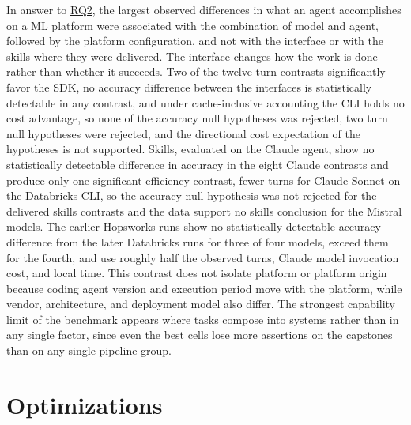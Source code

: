 \documentclass[
english,                 %
bibtex,                  %
]{kththesis}
\numberwithin{listing}{chapter}
\begin{document}
In answer to \hyperref[rq2]{RQ2}, the largest observed differences in what an agent accomplishes on a \gls{ML} platform were associated with the combination of model and agent, followed by the platform configuration, and not with the interface or with the skills where they were delivered. The interface changes how the work is done rather than whether it succeeds. Two of the twelve turn contrasts significantly favor the \gls{SDK}, no accuracy difference between the interfaces is statistically detectable in any contrast, and under cache-inclusive accounting the \gls{CLI} holds no cost advantage, so none of the accuracy null hypotheses was rejected, two turn null hypotheses were rejected, and the directional cost expectation of the hypotheses is not supported. Skills, evaluated on the Claude agent, show no statistically detectable difference in accuracy in the eight Claude contrasts and produce only one significant efficiency contrast, fewer turns for Claude Sonnet on the Databricks \gls{CLI}, so the accuracy null hypothesis was not rejected for the delivered skills contrasts and the data support no skills conclusion for the Mistral models. The earlier Hopsworks runs show no statistically detectable accuracy difference from the later Databricks runs for three of four models, exceed them for the fourth, and use roughly half the observed turns, Claude model invocation cost, and local time. This contrast does not isolate platform or platform origin because coding agent version and execution period move with the platform, while vendor, architecture, and deployment model also differ. The strongest capability limit of the benchmark appears where tasks compose into systems rather than in any single factor, since even the best cells lose more assertions on the capstones than on any single pipeline group.

\section{Optimizations}
\label{sec:results_optimizations}
\glsresetall
\end{document}
